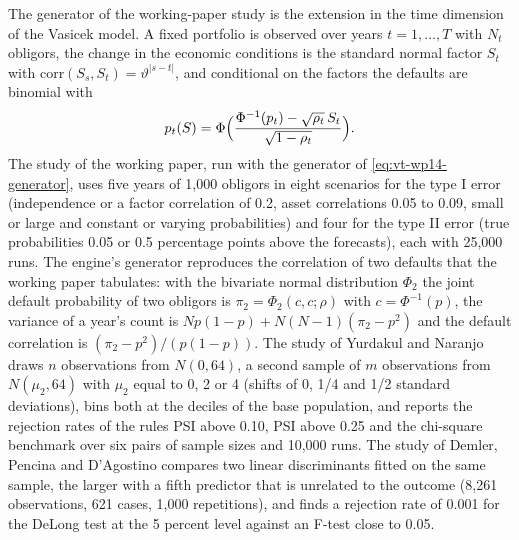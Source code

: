 The generator of the working-paper study is the extension in the time dimension of the Vasicek model. A fixed portfolio is observed over years $t=1,\dots,T$ with $N_t$ obligors, the change in the economic conditions is the standard normal factor $S_t$ with $\mathrm{corr}(S_s,S_t)=\vartheta^{|s-t|}$, and
conditional on the factors the defaults are binomial with
\begin{equation}
  p_t(S)=\Phi\Bigl(\frac{\Phi^{-1}(p_t)-\sqrt{\rho_t}\,S_t}{\sqrt{1-\rho_t}}\Bigr).
  \label{eq:vt-wp14-generator}
\end{equation}
The study of the working paper, run with the generator of \cref{eq:vt-wp14-generator}, uses five years of 1,000 obligors in eight scenarios for the type I error (independence or a factor correlation of 0.2, asset correlations 0.05 to 0.09, small or large and constant or varying probabilities) and four for the type II error (true probabilities 0.05 or 0.5 percentage points above the forecasts), each with 25,000 runs. The engine's generator
reproduces the correlation of two defaults that the working paper tabulates: with the bivariate normal distribution $\Phi_2$ the joint default probability of two obligors is $\pi_2=\Phi_2(c,c;\rho)$ with $c=\Phi^{-1}(p)$, the variance of a year's count is $Np(1-p)+N(N-1)(\pi_2-p^2)$ and the default correlation is $(\pi_2-p^2)/(p(1-p))$. The study of Yurdakul and Naranjo draws $n$ observations from
$N(0,64)$, a second sample of $m$ observations from $N(\mu_2,64)$ with $\mu_2$ equal to 0, 2 or 4 (shifts of 0, 1/4 and 1/2 standard deviations), bins both at the deciles of the base population, and reports the rejection rates of the rules PSI above 0.10, PSI above 0.25 and the chi-square benchmark over six pairs of sample sizes and 10,000 runs. The study of Demler, Pencina and D'Agostino compares two linear discriminants fitted on the
same sample, the larger with a fifth predictor that is unrelated to the outcome (8,261 observations, 621 cases, 1,000 repetitions), and finds a rejection rate of 0.001 for the DeLong test at the 5 percent level against an F-test close to 0.05.

